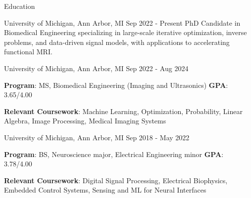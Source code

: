\documentclass{resume}
\begin{document}
\begin{rSection}{Education}
\begin{rSubsection}{University of Michigan}{, Ann Arbor, MI \hfill {Sep 2022 - Present}}
	PhD Candidate in Biomedical Engineering specializing in large-scale iterative optimization, inverse problems, and data-driven signal models, with applications to accelerating functional MRI.
\end{rSubsection}
\begin{rSubsection}{University of Michigan}{, Ann Arbor, MI \hfill {Sep 2022 - Aug 2024}}
	\item \textbf{Program}: MS, Biomedical Engineering (Imaging and Ultrasonics) \hfill{\textbf{GPA}: 3.65/4.00}
    \item{\textbf{Relevant Coursework}: Machine Learning, Optimization, Probability, Linear Algebra, Image Processing, Medical Imaging Systems}
\end{rSubsection}
\begin{rSubsection}{University of Michigan}{, Ann Arbor, MI \hfill {Sep 2018 - May 2022}}
	\item{\textbf{Program}: BS, Neuroscience major, Electrical Engineering minor} \hfill{\textbf{GPA}: 3.78/4.00}
    \item{\textbf{Relevant Coursework}: Digital Signal Processing, Electrical Biophysics, Embedded Control Systems, Sensing and ML for Neural Interfaces}
\end{rSubsection}
\end{rSection}
\end{document}
